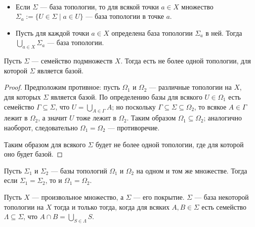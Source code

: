 \documentclass[12pt,a4paper]{article}
\begin{document}
    \begin{theorem}\ 
        \begin{itemize}
            \item Если $\Sigma$ --- база топологии, то для всякой точки $a \in X$ множество $\Sigma_a := \{U \in \Sigma \mid a \in U\}$ --- база топологии в точке $a$.
            \item Пусть для каждой точки $a \in X$ определена база топологии $\Sigma_a$ в ней. Тогда $\bigcup_{a \in X} \Sigma_a$ --- база топологии.
        \end{itemize}
    \end{theorem}

    \begin{theorem}
        Пусть $\Sigma$ --- семейство подмножеств $X$. Тогда есть не более одной топологии, для которой $\Sigma$ является базой.
    \end{theorem}

    \begin{proof}
        Предположим противное: пусть $\Omega_1$ и $\Omega_2$ --- различные топологии на $X$, для которых $\Sigma$ является базой. По определению базы для всякого $U \in \Omega_1$ есть семейство $\Gamma \subseteq \Sigma$, что $U = \bigcup_{A \in \Gamma} A$; но поскольку $\Gamma \subseteq \Sigma \subseteq \Omega_2$, то всякое $A \in \Gamma$ лежит в $\Omega_2$, а значит $U$ тоже лежит в $\Omega_2$. Таким образом $\Omega_1 \subseteq \Omega_2$; аналогично наоборот, следовательно $\Omega_1 = \Omega_2$ --- противоречие.

        Таким образом для всякого $\Sigma$ будет не более одной топологии, где для которой оно будет базой.
    \end{proof}

    \begin{corollary}
        Пусть $\Sigma_1$ и $\Sigma_2$ --- базы топологий $\Omega_1$ и $\Omega_2$ на одном и том же множестве. Тогда если $\Sigma_1 = \Sigma_2$, то и $\Omega_1 = \Omega_2$.
    \end{corollary}

    \begin{theorem}
        Пусть $X$ --- произвольное множество, а $\Sigma$ --- его покрытие. $\Sigma$ --- база некоторой топологии на $X$ тогда и только тогда, когда для всяких $A, B \in \Sigma$ есть семейство $\Lambda \subseteq \Sigma$, что $A \cap B = \bigcup_{S \in \Lambda} S$.
    \end{theorem}
\end{document}
